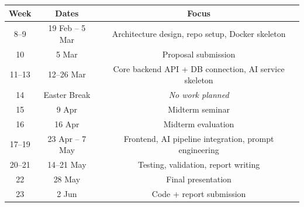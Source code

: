 \documentclass[12pt, a4paper]{article}
\begin{document}
\begin{table}[H]
    \centering
    \renewcommand{\arraystretch}{1.5}
    \begin{tabular}{|c|c|c|}
        \hline
        \textbf{Week} & \textbf{Dates}  & \textbf{Focus}                                        \\
        \hline
        8--9          & 19 Feb -- 5 Mar & Architecture design, repo setup, Docker skeleton      \\
        \hline
        10            & 5 Mar           & Proposal submission                                   \\
        \hline
        11--13        & 12--26 Mar      & Core backend API + DB connection, AI service skeleton \\
        \hline
        14            & Easter Break    & \multicolumn{1}{c|}{\textit{No work planned}}         \\
        \hline
        15            & 9 Apr           & Midterm seminar                                       \\
        \hline
        16            & 16 Apr          & Midterm evaluation                                    \\
        \hline
        17--19        & 23 Apr -- 7 May & Frontend, AI pipeline integration, prompt engineering \\
        \hline
        20--21        & 14--21 May      & Testing, validation, report writing                   \\
        \hline
        22            & 28 May          & Final presentation                                    \\
        \hline
        23            & 2 Jun           & Code + report submission                              \\
        \hline
    \end{tabular}
\end{table}
\end{document}
